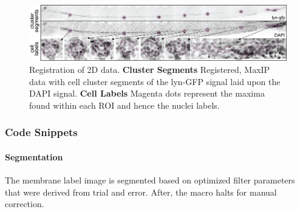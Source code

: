 \documentclass[10pt, b5paper, singlespacinge, twoside]{reedthesis} %
\theoremstyle{definition}
\theoremstyle{definition}
\theoremstyle{definition}
\theoremstyle{remark}
\begin{document}
\begin{figure}[h]

{\centering \includegraphics[width=0.95\linewidth,]{figures/materials/ground_truth/clusters/clusters} 

}

\caption[Registration of 2D data]{Registration of 2D data. \textbf{Cluster Segments} Registered, MaxIP data with cell cluster segments of the lyn-GFP signal laid upon the DAPI signal. \textbf{Cell Labels} Magenta dots represent the maxima found within each ROI and hence the nuclei labels.}\label{fig:maxllreg}
\end{figure}
\hypertarget{code-snippets}{%
\subsubsection{Code Snippets}\label{code-snippets}}

\hypertarget{segmentation}{%
\paragraph{Segmentation}\label{segmentation}}

The membrane label image is segmented based on optimized filter parameters that were derived from trial and error. After, the macro halts for manual correction.
\end{document}
